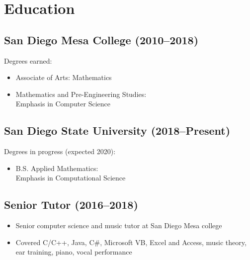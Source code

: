 \documentclass[10pt, letterpaper]{article}
\begin{document}
\section{Education}
\begin{multicols}{2}
  \begin{minipage}{0.5\textwidth}
    \subsection{San Diego Mesa College (2010--2018)}
    \begin{footnotesize}
      Degrees earned:
      \begin{itemize}
        \item
          Associate of Arts: Mathematics
        \item
          Mathematics and Pre-Engineering Studies:\\
          Emphasis in Computer Science
      \end{itemize}
    \end{footnotesize}
    \medskip

    \subsection{San Diego State University (2018--Present)}
    \begin{footnotesize}
      Degrees in progress (expected 2020):
      \begin{itemize}
        \item
          B.S. Applied Mathematics:\\
          \phantom{B.S. }Emphasis in Computational Science
      \end{itemize}
    \end{footnotesize}
  \end{minipage}
  \columnbreak%

  \begin{minipage}{0.5\textwidth}
    \subsection{Senior Tutor (2016--2018)}
    \begin{footnotesize}
      \begin{itemize}
        \item
          Senior computer science and music tutor at San Diego Mesa college
        \item
          Covered C/C++, Java, C\#, Microsoft VB, Excel and Access, music
          theory, ear training, piano, vocal performance
      \end{itemize}
    \end{footnotesize}
    \medskip


\end{minipage}
\end{multicols}
\end{document}
